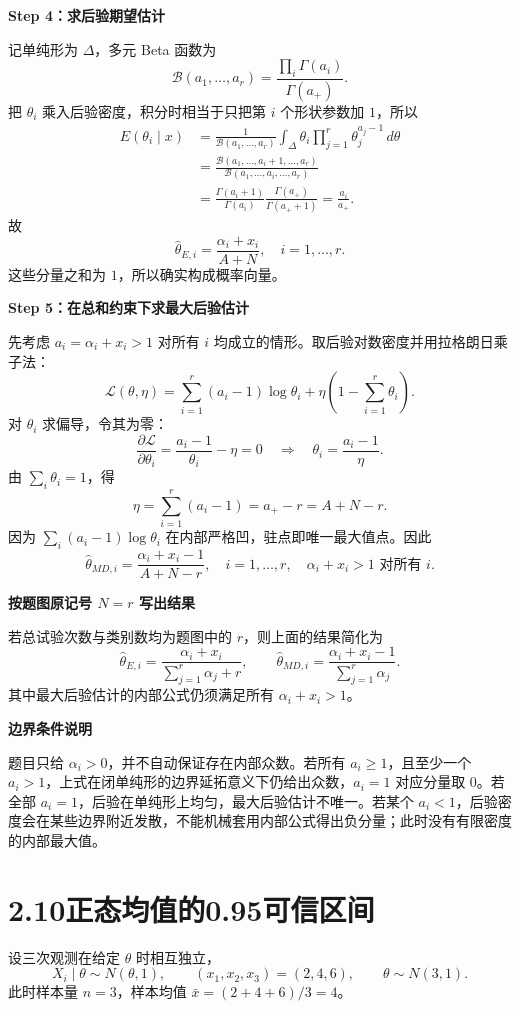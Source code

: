 \documentclass[UTF8,zihao=-4]{ctexart}
\newcommand{\step}[1]{\par\medskip\noindent\textbf{#1}\par\nopagebreak}
\begin{document}
\step{Step 4：求后验期望估计}
记单纯形为 $\Delta$，多元 Beta 函数为
\[
\mathcal B(a_1,\ldots,a_r)=\frac{\prod_i\Gamma(a_i)}{\Gamma(a_+)}.
\]
把 $\theta_i$ 乘入后验密度，积分时相当于只把第 $i$ 个形状参数加 $1$，所以
\begin{align*}
E(\theta_i\mid x)
&=\frac{1}{\mathcal B(a_1,\ldots,a_r)}
\int_\Delta\theta_i\prod_{j=1}^r\theta_j^{a_j-1}\,d\theta\\
&=\frac{\mathcal B(a_1,\ldots,a_i+1,\ldots,a_r)}
{\mathcal B(a_1,\ldots,a_i,\ldots,a_r)}\\
&=\frac{\Gamma(a_i+1)}{\Gamma(a_i)}
\frac{\Gamma(a_+)}{\Gamma(a_++1)}=\frac{a_i}{a_+}.
\end{align*}
故
\[
\boxed{\hat\theta_{E,i}=\frac{\alpha_i+x_i}{A+N},\quad i=1,\ldots,r.}
\]
这些分量之和为 $1$，所以确实构成概率向量。

\step{Step 5：在总和约束下求最大后验估计}
先考虑 $a_i=\alpha_i+x_i>1$ 对所有 $i$ 均成立的情形。取后验对数密度并用拉格朗日乘子法：
\[
\mathcal L(\theta,\eta)=\sum_{i=1}^r(a_i-1)\log\theta_i
+\eta\left(1-\sum_{i=1}^r\theta_i\right).
\]
对 $\theta_i$ 求偏导，令其为零：
\[
\frac{\partial\mathcal L}{\partial\theta_i}=\frac{a_i-1}{\theta_i}-\eta=0
\quad\Longrightarrow\quad\theta_i=\frac{a_i-1}{\eta}.
\]
由 $\sum_i\theta_i=1$，得
\[
\eta=\sum_{i=1}^r(a_i-1)=a_+-r=A+N-r.
\]
因为 $\sum_i(a_i-1)\log\theta_i$ 在内部严格凹，驻点即唯一最大值点。因此
\[
\boxed{\hat\theta_{MD,i}=\frac{\alpha_i+x_i-1}{A+N-r},\quad
i=1,\ldots,r,\quad\alpha_i+x_i>1\text{ 对所有 }i.}
\]

\step{按题图原记号 $N=r$ 写出结果}
若总试验次数与类别数均为题图中的 $r$，则上面的结果简化为
\[
\boxed{\hat\theta_{E,i}=\frac{\alpha_i+x_i}{\sum_{j=1}^r\alpha_j+r},
\qquad
\hat\theta_{MD,i}=\frac{\alpha_i+x_i-1}{\sum_{j=1}^r\alpha_j}.}
\]
其中最大后验估计的内部公式仍须满足所有 $\alpha_i+x_i>1$。

\step{边界条件说明}
题目只给 $\alpha_i>0$，并不自动保证存在内部众数。若所有 $a_i\geq1$，且至少一个 $a_i>1$，上式在闭单纯形的边界延拓意义下仍给出众数，$a_i=1$ 对应分量取 $0$。若全部 $a_i=1$，后验在单纯形上均匀，最大后验估计不唯一。若某个 $a_i<1$，后验密度会在某些边界附近发散，不能机械套用内部公式得出负分量；此时没有有限密度的内部最大值。

\section*{2.10\quad 正态均值的0.95可信区间}
设三次观测在给定 $\theta$ 时相互独立，
\[
X_i\mid\theta\sim N(\theta,1),\qquad(x_1,x_2,x_3)=(2,4,6),
\qquad\theta\sim N(3,1).
\]
此时样本量 $n=3$，样本均值 $\bar x=(2+4+6)/3=4$。
\end{document}
